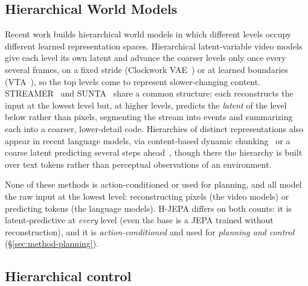 \subsection{Hierarchical World Models}
\label{sec:hier-abstraction}
Recent work builds hierarchical world models in which different levels occupy different
learned representation spaces. Hierarchical latent-variable video
models give each level its own latent and advance the coarser levels only once every
several frames, on a fixed stride (Clockwork VAE~\citep{saxena2021clockwork}) or at
learned boundaries (VTA~\citep{kim2019vta}), so the top levels come to represent
slower-changing content. STREAMER~\citep{mounir2023streamer} and
SUNTA~\citep{iiyama2026sunta} share a common structure: each reconstructs the input at the
lowest level but, at higher levels, predicts the \emph{latent} of the level below rather
than pixels, segmenting the stream into events and
summarizing each into a coarser, lower-detail code. Hierarchies of distinct
representations also appear in recent language models, via content-based dynamic chunking~\citep{pagnoni2024blt,hwang2025hnet} or a
coarse latent predicting several steps ahead~\citep{shi2026hilp}, though there the
hierarchy is built over text tokens rather than perceptual observations of an environment.

None of these methods is action-conditioned or used for planning, and all model the raw
input at the lowest level: reconstructing pixels (the video models) or predicting
tokens (the language models). H-JEPA differs on both counts: it is latent-predictive at
\emph{every} level (even the base is a JEPA trained without
reconstruction), and it is \emph{action-conditioned} and used for \emph{planning and
control} (\S\ref{sec:method-planning}).

\subsection{Hierarchical control}

